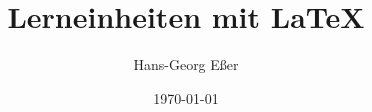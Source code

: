 \documentclass[a4paper,DIV7,11pt,headincludem,numbers=noendperiod]{scrbook}
\title{Lerneinheiten mit \textrm{\LaTeX{}}}
\author{Hans-Georg Eßer}
\date{\today}
\newcommand\IncludeChapters{


}
\begin{document}
\raggedbottom  %
\RaggedRight   %
\setlength{\parskip}{5pt}
\setlength{\parindent}{0pt}
\maketitle

\renewcommand*\chapterpagestyle{scrheadings}

\ActivateBG

\begin{adjmulticols}{1}{0cm}{-5.2cm}

\tableofcontents

\end{adjmulticols}


\IncludeChapters




\createbackmatter
\end{document}
